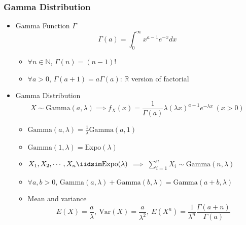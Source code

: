 \subsubsection*{Gamma Distribution}
\begin{itemize}
    \item Gamma Function $\Gamma$
    \begin{equation}
        \Gamma(a)=\int_0^\infty x^{a-1}e^{-x}dx
    \end{equation}
    \begin{itemize}
        \item $\forall n\in\mathbb{N}$, $\Gamma(n)=(n-1)!$
        \item $\forall a>0$, $\Gamma(a+1)=a\Gamma(a)$: $\mathbb{R}$ version of factorial
    \end{itemize}
    \item Gamma Distribution
    \begin{equation}
        X\sim\text{Gamma}(a,\lambda)\implies f_X(x)=\frac{1}{\Gamma(a)}\lambda (\lambda x)^{a-1}e^{-\lambda x}~(x>0)
    \end{equation}
    \begin{itemize}
        \item $\text{Gamma}(a,\lambda)=\frac{1}{\lambda}\text{Gamma}(a,1)$
        \item $\text{Gamma}(1,\lambda)=\text{Expo}(\lambda)$
        \item $X_1,X_2,\cdots,X_n\iidsim\text{Expo}(\lambda)$ $\implies$ $\sum_{i=1}^nX_i\sim\text{Gamma}(n,\lambda)$
        \item $\forall a,b>0$, $\text{Gamma}(a,\lambda)+\text{Gamma}(b,\lambda)=\text{Gamma}(a+b,\lambda)$
        \item Mean and variance
        \begin{equation}
            E(X)=\frac{a}{\lambda},~\text{Var}(X)=\frac{a}{\lambda^2},~E(X^n)=\frac{1}{\lambda^n}\frac{\Gamma(a+n)}{\Gamma(a)}
        \end{equation}
    \end{itemize}
\end{itemize}
\clearpage
\begin{figures}
\end{figures}

